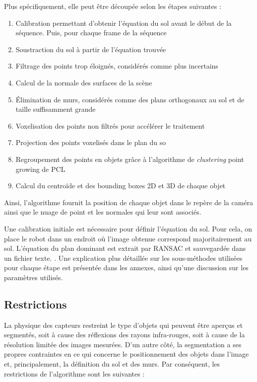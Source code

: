 Plus spécifiquement, elle peut être découpée selon les étapes suivantes :
\begin{enumerate}[start=0]
\item Calibration permettant d'obtenir l'équation du sol avant le début de la séquence. Puis, pour chaque frame de la séquence
\item Soustraction du sol à partir de l'équation trouvée
\item Filtrage des points trop éloignés, considérés comme plus incertains
\item Calcul de la normale des surfaces de la scène
\item Élimination de murs, considérés comme des plans orthogonaux au sol et de taille suffisamment grande
\item Voxelisation des points non filtrés pour accélérer le traitement
\item Projection des points voxelisés dans le plan du so
\item Regroupement des points en objets grâce à l'algorithme de \textit{clustering} point growing de PCL
\item Calcul du centroïde et des bounding boxes 2D et 3D de chaque objet
\end{enumerate}

Ainsi, l'algorithme fournit la position de chaque objet dans le repère de la caméra ainsi que le nuage de point et les normales qui leur sont associés.

Une calibration initiale est nécessaire pour définir l'équation du sol. Pour cela, on place le robot dans un endroit où l'image obtenue correspond majoritairement au sol. L’équation du plan dominant est extrait par RANSAC et sauvegardée dans un fichier texte. . Une explication plus détaillée sur les sous-méthodes utilisées pour chaque étape est présentée dans les annexes, ainsi qu'une discussion sur les paramètres utilisés.


\subsection{Restrictions} 
La physique des capteurs restreint le type d'objets qui peuvent être aperçus et segmentés, soit à cause des réflexions des rayons infra-rouges, soit à cause de la
résolution limitée des images mesurées. D'un autre côté, la segmentation a ses propres contraintes en ce qui concerne le positionnement des objets dans l'image et, principalement, la définition du sol et des murs. Par conséquent, les restrictions de l'algorithme sont les suivantes :

